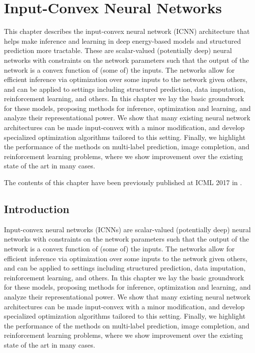 \graphicspath{{icnn/images/}}

\chapter{Input-Convex Neural Networks}
\label{sec:icnn}
This chapter describes the input-convex neural network (ICNN)
architecture that helps make inference and learning in deep
energy-based models and structured prediction more tractable.
These are scalar-valued (potentially
deep) neural networks with constraints
on the network parameters such that the output
of the network is a convex function of (some
of) the inputs. The networks allow for efficient
inference via optimization over some inputs to
the network given others, and can be applied to
settings including structured prediction, data imputation,
reinforcement learning, and others. In
this chapter we lay the basic groundwork for these
models, proposing methods for inference, optimization
and learning, and analyze their representational
power. We show that many existing
neural network architectures can be made input-convex
with a minor modification, and develop
specialized optimization algorithms tailored to
this setting. Finally, we highlight the performance
of the methods on multi-label prediction,
image completion, and reinforcement learning
problems, where we show improvement over the
existing state of the art in many cases.

The contents of this chapter have been previously published
at ICML 2017 in \citet{amos2017input}.

\section{Introduction}
Input-convex neural networks (ICNNs) are scalar-valued (potentially deep) neural
networks with constraints on the network parameters such that the
output of the network is a convex function of (some of) the inputs.
The networks allow for efficient inference via optimization over some
inputs to the network given others, and can be applied to settings
including structured prediction, data imputation, reinforcement
learning, and others.
In this chapter we lay the basic groundwork for these models,
proposing methods for inference, optimization and learning, and
analyze their representational power.
We show that many
existing neural network architectures can be made input-convex with
a minor modification, and develop specialized optimization
algorithms tailored to this setting. Finally, we highlight the
performance of the methods on multi-label prediction, image
completion, and reinforcement learning problems, where we show
improvement over the existing state of the art in many cases.

